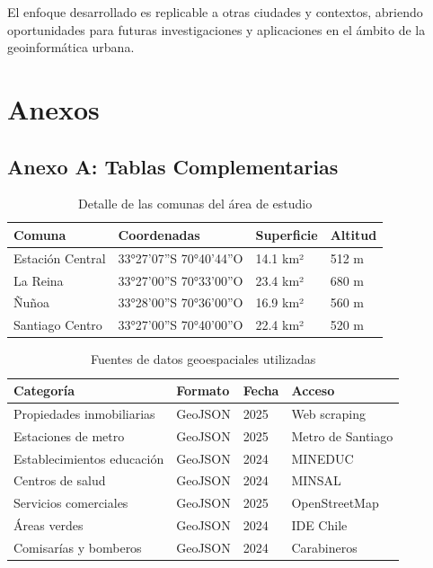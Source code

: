 \documentclass[11pt,letterpaper]{article}
\begin{document}
El enfoque desarrollado es replicable a otras ciudades y contextos, abriendo oportunidades para futuras investigaciones y aplicaciones en el ámbito de la geoinformática urbana.

\newpage
\printbibliography
{}

\newpage
\appendix
\section{Anexos}

\subsection{Anexo A: Tablas Complementarias}

\begin{table}[H]
\centering
\caption{Detalle de las comunas del área de estudio}
\label{tab:comunas_detalle}
\begin{tabular}{@{}llll@{}}
\toprule
\textbf{Comuna} & \textbf{Coordenadas} & \textbf{Superficie} & \textbf{Altitud} \\
\midrule
Estación Central & 33°27'07''S 70°40'44''O & 14.1 km² & 512 m \\
La Reina & 33°27'00''S 70°33'00''O & 23.4 km² & 680 m \\
Ñuñoa & 33°28'00''S 70°36'00''O & 16.9 km² & 560 m \\
Santiago Centro & 33°27'00''S 70°40'00''O & 22.4 km² & 520 m \\
\bottomrule
\end{tabular}
\end{table}

\begin{table}[H]
\centering
\caption{Fuentes de datos geoespaciales utilizadas}
\label{tab:fuentes}
\begin{tabular}{@{}llll@{}}
\toprule
\textbf{Categoría} & \textbf{Formato} & \textbf{Fecha} & \textbf{Acceso} \\
\midrule
Propiedades inmobiliarias & GeoJSON & 2025 & Web scraping \\
Estaciones de metro & GeoJSON & 2025 & Metro de Santiago \\
Establecimientos educación & GeoJSON & 2024 & MINEDUC \\
Centros de salud & GeoJSON & 2024 & MINSAL \\
Servicios comerciales & GeoJSON & 2025 & OpenStreetMap \\
Áreas verdes & GeoJSON & 2024 & IDE Chile \\
Comisarías y bomberos & GeoJSON & 2024 & Carabineros \\
\bottomrule
\end{tabular}
\end{table}
\end{document}
